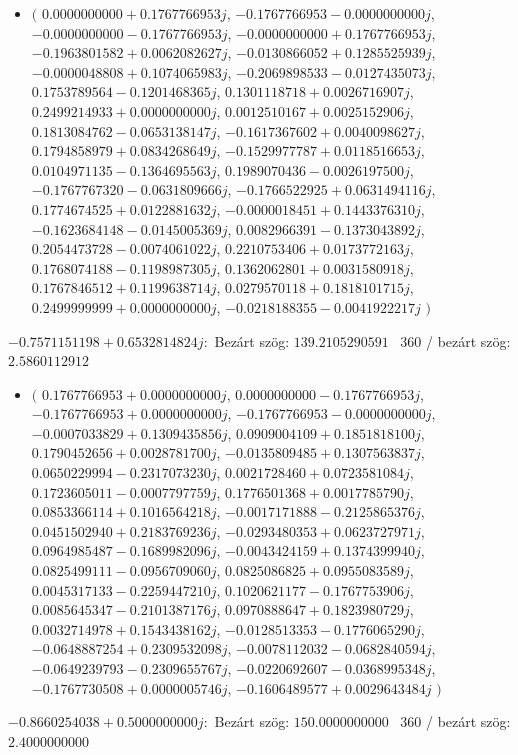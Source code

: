 \documentclass[14pt,a4paper]{article}
\begin{document}
\begin{itemize}
\item
$\big($
$0.0000000000+0.1767766953j$, $-0.1767766953-0.0000000000j$, $-0.0000000000-0.1767766953j$, $-0.0000000000+0.1767766953j$, $-0.1963801582+0.0062082627j$, $-0.0130866052+0.1285525939j$, $-0.0000048808+0.1074065983j$, $-0.2069898533-0.0127435073j$, $0.1753789564-0.1201468365j$, $0.1301118718+0.0026716907j$, $0.2499214933+0.0000000000j$, $0.0012510167+0.0025152906j$, $0.1813084762-0.0653138147j$, $-0.1617367602+0.0040098627j$, $0.1794858979+0.0834268649j$, $-0.1529977787+0.0118516653j$, $0.0104971135-0.1364695563j$, $0.1989070436-0.0026197500j$, $-0.1767767320-0.0631809666j$, $-0.1766522925+0.0631494116j$, $0.1774674525+0.0122881632j$, $-0.0000018451+0.1443376310j$, $-0.1623684148-0.0145005369j$, $0.0082966391-0.1373043892j$, $0.2054473728-0.0074061022j$, $0.2210753406+0.0173772163j$, $0.1768074188-0.1198987305j$, $0.1362062801+0.0031580918j$, $0.1767846512+0.1199638714j$, $0.0279570118+0.1818101715j$, $0.2499999999+0.0000000000j$, $-0.0218188355-0.0041922217j$
$\big)$
\end{itemize}
$-0.7571151198+0.6532814824j$:\
Bezárt szög: $139.2105290591$ \
360 / bezárt szög: $2.5860112912$\
\begin{itemize}
\item
$\big($
$0.1767766953+0.0000000000j$, $0.0000000000-0.1767766953j$, $-0.1767766953+0.0000000000j$, $-0.1767766953-0.0000000000j$, $-0.0007033829+0.1309435856j$, $0.0909004109+0.1851818100j$, $0.1790452656+0.0028781700j$, $-0.0135809485+0.1307563837j$, $0.0650229994-0.2317073230j$, $0.0021728460+0.0723581084j$, $0.1723605011-0.0007797759j$, $0.1776501368+0.0017785790j$, $0.0853366114+0.1016564218j$, $-0.0017171888-0.2125865376j$, $0.0451502940+0.2183769236j$, $-0.0293480353+0.0623727971j$, $0.0964985487-0.1689982096j$, $-0.0043424159+0.1374399940j$, $0.0825499111-0.0956709060j$, $0.0825086825+0.0955083589j$, $0.0045317133-0.2259447210j$, $0.1020621177-0.1767753906j$, $0.0085645347-0.2101387176j$, $0.0970888647+0.1823980729j$, $0.0032714978+0.1543438162j$, $-0.0128513353-0.1776065290j$, $-0.0648887254+0.2309532098j$, $-0.0078112032-0.0682840594j$, $-0.0649239793-0.2309655767j$, $-0.0220692607-0.0368995348j$, $-0.1767730508+0.0000005746j$, $-0.1606489577+0.0029643484j$
$\big)$
\end{itemize}
$-0.8660254038+0.5000000000j$:\
Bezárt szög: $150.0000000000$ \
360 / bezárt szög: $2.4000000000$\
\end{document}
